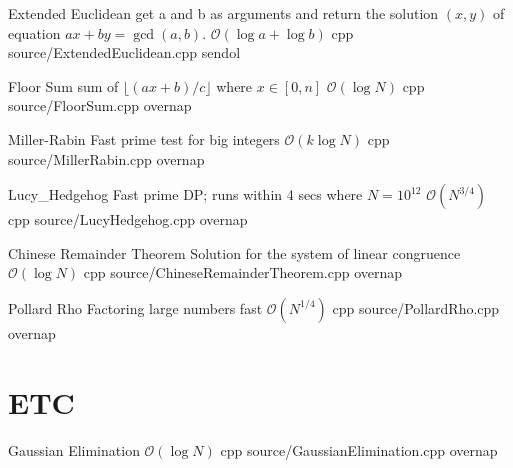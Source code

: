 \documentclass[landscape, 10pt, a4paper, oneside, twocolumn]{extarticle}
\begin{document}
\Algorithm
{Extended Euclidean}
{get a and b as arguments and return the solution $(x, y)$ of equation $ax + by = \gcd(a, b)$.}
{$\mathcal{O}(\log{a} + \log{b})$}
{cpp}
{source/ExtendedEuclidean.cpp}
{sendol}

\Algorithm
{Floor Sum}
{sum of $\lfloor(ax + b)/c\rfloor$ where $x \in [0, n]$}
{$\mathcal{O}(\log{N})$}
{cpp}
{source/FloorSum.cpp}
{overnap}

\Algorithm
{Miller-Rabin}
{Fast prime test for big integers}
{$\mathcal{O}(k\log{N})$}
{cpp}
{source/MillerRabin.cpp}
{overnap}

\Algorithm
{Lucy\_Hedgehog}
{Fast prime DP; runs within 4 secs where $N=10^{12}$}
{$\mathcal{O}(N^{3/4})$}
{cpp}
{source/LucyHedgehog.cpp}
{overnap}

\Algorithm
{Chinese Remainder Theorem}
{Solution for the system of linear congruence}
{$\mathcal{O}(\log{N})$}
{cpp}
{source/ChineseRemainderTheorem.cpp}
{overnap}

\Algorithm
{Pollard Rho}
{Factoring large numbers fast}
{$\mathcal{O}(N^{1/4})$}
{cpp}
{source/PollardRho.cpp}
{overnap}


\section{ETC}

\Algorithm
{Gaussian Elimination}
{}
{$\mathcal{O}(\log{N})$}
{cpp}
{source/GaussianElimination.cpp}
{overnap}





\end{document}
